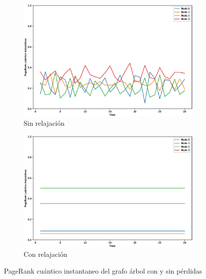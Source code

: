 \documentclass[xetex,mathserif,serif]{beamer}
\begin{document}
\begin{frame}
\begin{figure}[H]
    \centering
    \begin{subfigure}[m]{0.45\textwidth}
        \centering
        \includegraphics[width=0.9\linewidth]{img/tree-inst-lossless.eps}
        \caption{Sin relajación}
    \end{subfigure}
    \begin{subfigure}[m]{0.45\textwidth}
        \centering
        \includegraphics[width=0.9\linewidth]{img/tree-inst-lossy.eps}
        \caption{Con relajación}
    \end{subfigure}
    \caption[PageRank cuántico instantaneo del grafo árbol con y sin pérdidas]{PageRank cuántico instantaneo del grafo árbol con y sin pérdidas}
    \label{fig:insttreelossy}
\end{figure}


\end{frame}
\end{document}
